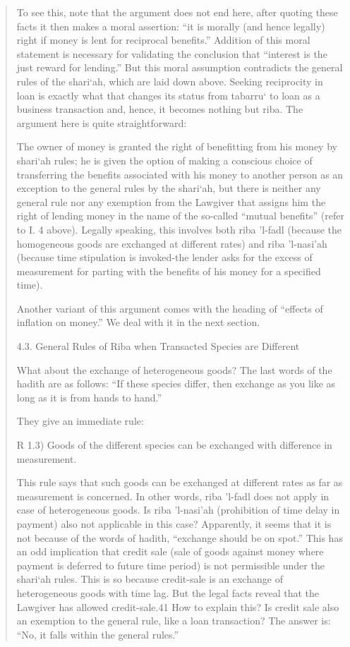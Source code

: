 \begin{quote}
To see this, note that the argument does not end here, after quoting these facts it then makes a moral assertion: “it is morally (and hence legally) right if money is lent for reciprocal benefits.” Addition of this moral statement is necessary for validating the conclusion that “interest is the just reward for lending.” But this moral assumption contradicts the general rules of the shari‘ah, which are laid down above. Seeking reciprocity in loan is exactly what that changes its status from tabarru‘ to loan as a business transaction and, hence, it becomes nothing but riba. The argument here is quite straightforward:

The owner of money is granted the right of benefitting from his money by shari‘ah rules; he is given the option of making a conscious choice of transferring the benefits associated with his money to another person as an exception to the general rules by the shari‘ah, but there is neither any general rule nor any exemption from the Lawgiver that assigns him the right of lending money in the name of the so-called “mutual benefits” (refer to I. 4 above). Legally speaking, this involves both riba 'l-fadl (because the homogeneous goods are exchanged at different rates) and riba 'l-nasi'ah (because time stipulation is invoked-the lender asks for the excess of measurement for parting with the benefits of his money for a specified time).

Another variant of this argument comes with the heading of “effects of inflation on money.” We deal with it in the next section.

4.3. General Rules of Riba when Transacted Species are Different

What about the exchange of heterogeneous goods? The last words of the hadith are as follows: “If these species differ, then exchange as you like as long as it is from hands to hand.”

They give an immediate rule:

R 1.3) Goods of the different species can be exchanged with difference in measurement.

This rule says that such goods can be exchanged at different rates as far as measurement is concerned. In other words, riba 'l-fadl does not apply in case of heterogeneous goods. Is riba 'l-nasi'ah (prohibition of time delay in payment) also not applicable in this case? Apparently, it seems that it is not because of the words of hadith, “exchange should be on spot.” This has an odd implication that credit sale (sale of goods against money where payment is deferred to future time period) is not permissible under the shari‘ah rules. This is so because credit-sale is an exchange of heterogeneous goods with time lag. But the legal facts reveal that the Lawgiver has allowed credit-sale.41 How to explain this? Is credit sale also an exemption to the general rule, like a loan transaction? The answer is: “No, it falls within the general rules.”


\end{quote}
